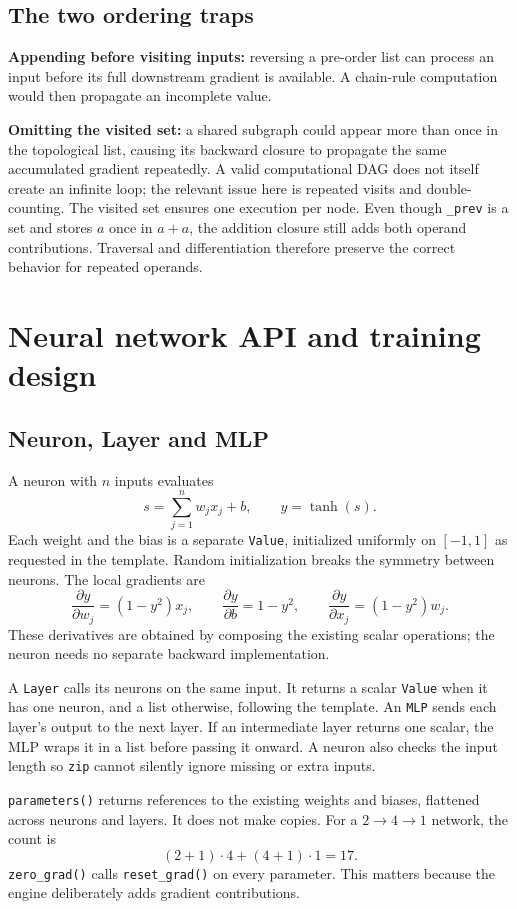 \documentclass[11pt,a4paper]{article}
\newcommand{\code}[1]{\texttt{#1}}
\begin{document}
\subsection{The two ordering traps}
\textbf{Appending before visiting inputs:} reversing a pre-order list can
process an input before its full downstream gradient is available. A
chain-rule computation would then propagate an incomplete value.

\textbf{Omitting the visited set:} a shared subgraph could appear more than
once in the topological list, causing its backward closure to propagate
the same accumulated gradient repeatedly. A valid computational DAG does
not itself create an infinite loop; the relevant issue here is repeated
visits and double-counting. The visited set ensures one execution per node.
Even though \code{\_prev} is a set and stores $a$ once in $a+a$, the addition
closure still adds both operand contributions. Traversal and differentiation
therefore preserve the correct behavior for repeated operands.

\newpage
\section{Neural network API and training design}
\subsection{Neuron, Layer and MLP}
A neuron with $n$ inputs evaluates
\[
s=\sum_{j=1}^{n}w_jx_j+b,\qquad y=\tanh(s).
\]
Each weight and the bias is a separate \code{Value}, initialized uniformly
on $[-1,1]$ as requested in the template. Random initialization breaks the
symmetry between neurons. The local gradients are
\[
\frac{\partial y}{\partial w_j}=(1-y^2)x_j,\qquad
\frac{\partial y}{\partial b}=1-y^2,\qquad
\frac{\partial y}{\partial x_j}=(1-y^2)w_j.
\]
These derivatives are obtained by composing the existing scalar operations;
the neuron needs no separate backward implementation.

A \code{Layer} calls its neurons on the same input. It returns a scalar
\code{Value} when it has one neuron, and a list otherwise, following the
template. An \code{MLP} sends each layer's output to the next layer. If an
intermediate layer returns one scalar, the MLP wraps it in a list before
passing it onward. A neuron also checks the input length so \code{zip}
cannot silently ignore missing or extra inputs.

\code{parameters()} returns references to the existing weights and biases,
flattened across neurons and layers. It does not make copies. For a
$2\to4\to1$ network, the count is
\[
(2+1)\cdot4+(4+1)\cdot1=17.
\]
\code{zero\_grad()} calls \code{reset\_grad()} on every parameter. This matters
because the engine deliberately adds gradient contributions.
\end{document}
